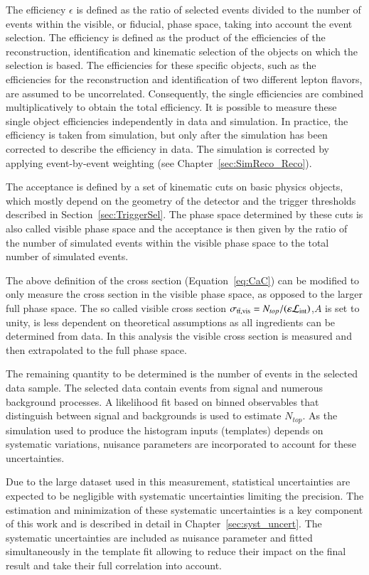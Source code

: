 The efficiency $\epsilon$ is defined as the ratio of selected \ttbar events divided to the number of \ttbar events within the visible, or fiducial, phase space, taking into account the event selection. The efficiency is defined as the product of the efficiencies of the reconstruction, identification and kinematic selection of the objects on which the selection is based.
The efficiencies for these specific objects, such as the
efficiencies for the reconstruction and identification of two different lepton flavors, are assumed to be uncorrelated. Consequently, the single efficiencies are combined multiplicatively to obtain the total efficiency.
It is possible to measure these single object efficiencies independently in data and simulation.
In practice, the efficiency is taken from simulation, but only after the simulation has been corrected to describe the efficiency in data. The simulation is corrected by applying event-by-event weighting (see Chapter~\ref{sec:SimReco_Reco}).

The acceptance is defined by a set of kinematic cuts on basic physics objects, which mostly depend on the geometry of the detector and the trigger thresholds described in Section~\ref{sec:TriggerSel}.
The phase space determined by these cuts is also called visible phase space and the acceptance is then given by the ratio of the number of simulated \ttbar events within the visible phase space to the total number of simulated \ttbar events. 

The above definition of the cross section (Equation~\ref{eq:CaC}) can be modified to only measure the cross section in the visible phase space, as opposed to the larger full phase space. The so called visible cross section $\sigma_{\mathrm{t}\bar{\mathrm{t}},\mathrm{vis}} = N_{top} /(\varepsilon \mathcal{L}_\mathrm{int})$,\ie $A$ is set to unity, is less dependent on theoretical assumptions as all ingredients can be determined from data.
In this analysis the visible cross section is measured and then extrapolated to the full phase space.

The remaining quantity to be determined is the number of \ttbar events in the selected data sample. The selected data contain events from signal and numerous background processes. A likelihood fit based on binned 
observables that distinguish between signal and backgrounds is used to estimate $N_{top}$. As the simulation used to produce the histogram inputs (templates) depends on systematic variations, nuisance parameters are incorporated to account for these uncertainties.

Due to the large dataset used in this measurement, statistical uncertainties are expected to be negligible with systematic uncertainties limiting the precision. The estimation and minimization of these systematic uncertainties 
is a key component of this work and is described in detail in Chapter~\ref{sec:syst_uncert}.
The systematic uncertainties are included as nuisance parameter and fitted simultaneously in the template fit allowing to reduce their impact on the final result and take their full correlation into account.

